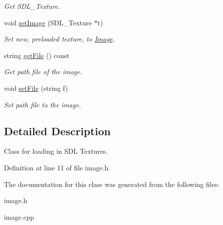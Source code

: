 \begin{DoxyCompactItemize}
\begin{DoxyCompactList}\small\item\em Get S\+D\+L\+\_\+\+Texture. \end{DoxyCompactList}\item 
void \hyperlink{classImage_af42b5d6a8abd90d67e9ae19e374520da}{set\+Image} (S\+D\+L\+\_\+\+Texture $\ast$t)\hypertarget{classImage_af42b5d6a8abd90d67e9ae19e374520da}{}\label{classImage_af42b5d6a8abd90d67e9ae19e374520da}

\begin{DoxyCompactList}\small\item\em Set new, preloaded texture, to \hyperlink{classImage}{Image}. \end{DoxyCompactList}\item 
string \hyperlink{classImage_aebc4cdd98961289324e6159b77ee3e69}{get\+File} () const \hypertarget{classImage_aebc4cdd98961289324e6159b77ee3e69}{}\label{classImage_aebc4cdd98961289324e6159b77ee3e69}

\begin{DoxyCompactList}\small\item\em Get path file of the image. \end{DoxyCompactList}\item 
void \hyperlink{classImage_ab4030489c65a25b2e0c458acac0ca94e}{set\+File} (string f)\hypertarget{classImage_ab4030489c65a25b2e0c458acac0ca94e}{}\label{classImage_ab4030489c65a25b2e0c458acac0ca94e}

\begin{DoxyCompactList}\small\item\em Set path file to the image. \end{DoxyCompactList}\end{DoxyCompactItemize}


\subsection{Detailed Description}
Class for loading in S\+DL Textures. 

Definition at line 11 of file image.\+h.



The documentation for this class was generated from the following files\+:\begin{DoxyCompactItemize}
\item 
image.\+h\item 
image.\+cpp\end{DoxyCompactItemize}
